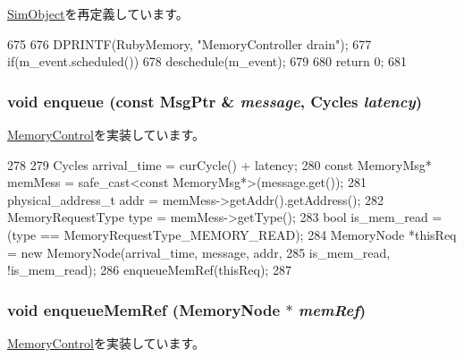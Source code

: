 \hyperlink{classSimObject_a6bf479c521c7c3eb473822d953275b26}{SimObject}を再定義しています。


\begin{DoxyCode}
675 {
676     DPRINTF(RubyMemory, "MemoryController drain\n");
677     if(m_event.scheduled()) {
678         deschedule(m_event);
679     }
680     return 0;
681 }
\end{DoxyCode}
\hypertarget{classRubyMemoryControl_a068a03cd419d33592fd584ec5877bb64}{
\subsubsection[{enqueue}]{\setlength{\rightskip}{0pt plus 5cm}void enqueue (const {\bf MsgPtr} \& {\em message}, \/  {\bf Cycles} {\em latency})}}
\label{classRubyMemoryControl_a068a03cd419d33592fd584ec5877bb64}


\hyperlink{classMemoryControl_a8295a9f6c98555275292b9c1296ea35a}{MemoryControl}を実装しています。


\begin{DoxyCode}
278 {
279     Cycles arrival_time = curCycle() + latency;
280     const MemoryMsg* memMess = safe_cast<const MemoryMsg*>(message.get());
281     physical_address_t addr = memMess->getAddr().getAddress();
282     MemoryRequestType type = memMess->getType();
283     bool is_mem_read = (type == MemoryRequestType_MEMORY_READ);
284     MemoryNode *thisReq = new MemoryNode(arrival_time, message, addr,
285                                          is_mem_read, !is_mem_read);
286     enqueueMemRef(thisReq);
287 }
\end{DoxyCode}
\hypertarget{classRubyMemoryControl_aadad7bc8b989cfe93247844131735f70}{
\subsubsection[{enqueueMemRef}]{\setlength{\rightskip}{0pt plus 5cm}void enqueueMemRef ({\bf MemoryNode} $\ast$ {\em memRef})}}
\label{classRubyMemoryControl_aadad7bc8b989cfe93247844131735f70}


\hyperlink{classMemoryControl_a8c508812a5b1b935117dc32877229599}{MemoryControl}を実装しています。


